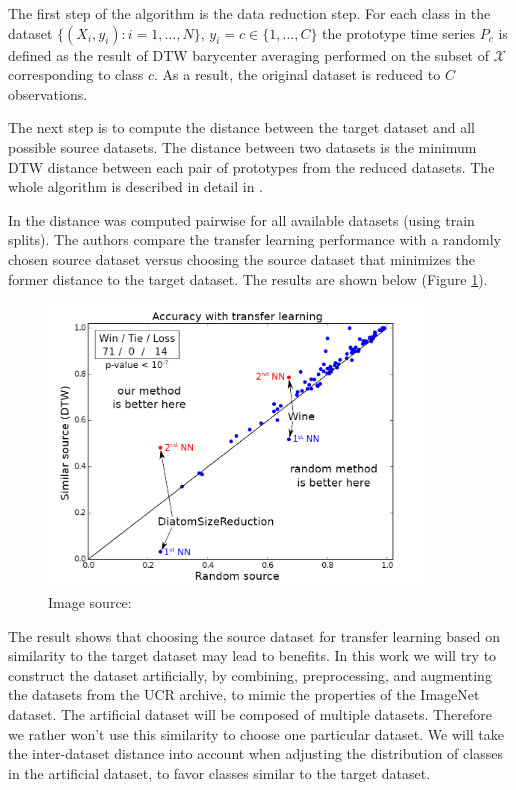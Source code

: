 \documentclass[a4paper,11pt,twoside]{report}
\theoremstyle{definition}
\begin{document}
The first step of the algorithm is the data reduction step. For each class in the dataset $\{(X_i, y_i): i=1, \dots , N\}$, $y_i=c \in \{ 1, \dots, C\}$ the prototype time series $P_c$ is defined as the result of DTW barycenter averaging performed on the subset of $\mathcal{X}$ corresponding to class $c$. As a result, the original dataset is reduced to $C$ observations.


The next step is to compute the distance between the target dataset and all possible source datasets. The distance between two datasets is the minimum DTW distance between each pair of prototypes from the reduced datasets. The whole algorithm is described in detail in \cite{transfer_learning_time_series}.

In \cite{transfer_learning_time_series} the distance was computed pairwise for all available datasets (using train splits). The authors compare the transfer learning performance with a randomly chosen source dataset versus choosing the source dataset that minimizes the former distance to the target dataset. The results are shown below (Figure \ref{fig:smart_transfer_learning}).
\FloatBarrier


\begin{figure}[h!]
\centering
\includegraphics[width=10cm]{imgs/smart_transfer_learning.png}
\caption{Image source: \cite{transfer_learning_time_series}}
\label{fig:smart_transfer_learning}
\end{figure}
\FloatBarrier

The result shows that choosing the source dataset for transfer learning based on similarity to the target dataset may lead to benefits. In this work we will try to construct the dataset artificially, by combining, preprocessing, and augmenting the datasets from the UCR archive, to mimic the properties of the ImageNet dataset. The artificial dataset will be composed of multiple datasets. Therefore we rather won't use this similarity to choose one particular dataset. We will take the inter-dataset distance into account when adjusting the distribution of classes in the artificial dataset, to favor classes similar to the target dataset.
\
\end{document}
